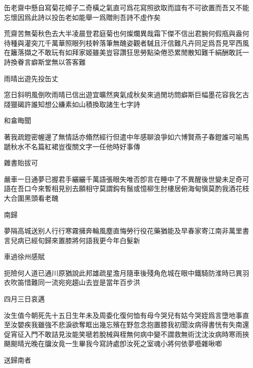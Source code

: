 \documentclass{zhvt-classic-Miya}
\begin{document}
\begin{fw}缶老齋中懸自寫菊花幛子二奇橫之氣直可爲花寫照欲取而誼有不可欲置而吾又不能忘懷因爲此詩以投缶老如能舉一爲贈則吾詩不虛作矣\end{fw}

荒齋苦無菊秋色去大半凌晨登君庭菊也何燦爛異哉霜下傑不信出君腕何假甁與盎何待種與灌突兀千萬華照眼列枝幹落筆無醜姿觀者駴且汗信難凡卉同足爲吾見罕西風在籬落擷之不敢玩有如拜家姬雖美豈容讚狂思勞點染倦恐累閒散知難千絹酬敢託一詩換眷言癖斯堂無以答客難

\begin{fw}雨晴出遊先投缶丈\end{fw}

窓日斜明風倒吹雨晴已信出遊宜曠然爽氣成秋矣來過閒坊問癖斯巨幅墨花容我乞古牋獵碣許誰知想公縑素如山積換取諸生七字詩

\begin{fw}和畣晦聞\end{fw}

著我疏鐙密幄邊了無情話亦翛然經行但遣中年感聊浪爭如六博賢燕子春鐙誰可喻馬蹏秋水不名篇紅裙豈復關文字一任他時好事傳

\begin{fw}雜書貽拔可\end{fw}

嚴車一日通夢已握君手纚纚千萬語張眼失唯否卽言在睡中了不異醒後世變未足奇可語在吾口今來暫相見别去願相守莫謂鈎有鬚或憶柳生肘樓居俯海甸愼莫酌我酒花枝大合圍黑頭看老醜

\begin{fw}南歸\end{fw}

夢隔高城送别人行行寒霧擁奔輪風塵直悔勞行役花藥猶能及早春家寄江南非萬里書言兒病已經旬歸來置膝將何語我更今年白髮新

\begin{fw}車過徐州感賦\end{fw}

扼險何人道已通川原猶說此邦雄疏星澹月隨車後殘角危城在眼中鐵騎防淮時已異羽衣吹笛惜難同一流宛宛趨山去豈是當年百步洪

\begin{fw}四月三日哀邁\end{fw}

汝生值今朝死先十五日生年未及周委化復何恤有母今哭兒有姑今哭姪爲言墮地事直至汝嬰疾我雖強不悲淚欲奪眶出幾忘殯在野忽念抱置膝我初聞汝病得書恍有失南還促宵征入門不敢詰見汝能笑嗁若脫械與桎無何病中變不謂救無術沈沈汝病時寒雨挾颶䫻晴光晚在牖汝竟一生畢我今寫詩處卽汝死之室魂小將何依夢囈雜啾喞

\begin{fw}送歸南者\end{fw}
\end{document}
